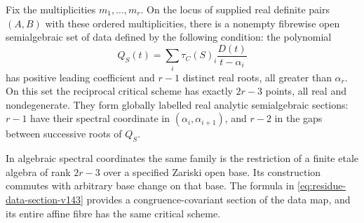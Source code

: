 \begin{theorem}
\label{thm:real-critical-cover-v143}
Fix the multiplicities \(m_1,\ldots,m_r\).  On the locus of supplied
real definite pairs \((A,B)\) with these ordered multiplicities,
there is a nonempty fibrewise open semialgebraic set of data defined
by the following condition: the polynomial
\begin{equation}\label{eq:interpolation-polynomial-v143}
 Q_S(t)=\sum_i\tau_C(S)_i\frac{D(t)}{t-\alpha_i}
\end{equation}
has positive leading coefficient and \(r-1\) distinct real roots,
all greater than \(\alpha_r\).
On this set the reciprocal critical scheme has exactly \(2r-3\)
points, all real and nondegenerate.  They form globally labelled
real analytic semialgebraic sections: \(r-1\) have their spectral
coordinate in \((\alpha_i,\alpha_{i+1})\), and \(r-2\) in the
gaps between successive roots of \(Q_S\).

In algebraic spectral coordinates the same family is the restriction
of a finite etale algebra of rank \(2r-3\) over a specified Zariski
open base.  Its construction commutes with arbitrary base change on
that base.  The formula in \eqref{eq:residue-data-section-v143}
provides a congruence-covariant section of the data map, and its
entire affine fibre has the same critical scheme.
\end{theorem}
